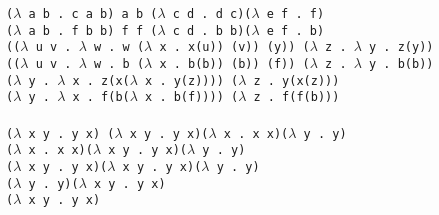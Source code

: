 \texttt{($\lambda$ a b .~c a b) a b ($\lambda$ c d .~d c)($\lambda$ e f .~f) }\\
\texttt{($\lambda$ a b .~f b b) f f ($\lambda$ c d .~b b)($\lambda$ e f .~b) }\\

\noindent
\texttt{(($\lambda$ u v .~$\lambda$ w .~w ($\lambda$ x .~x(u)) (v)) (y)) ($\lambda$ z .~$\lambda$ y .~z(y))}\\
\texttt{(($\lambda$ u v .~$\lambda$ w .~b ($\lambda$ x .~b(b)) (b)) (f)) ($\lambda$ z .~$\lambda$ y .~b(b))}\\

\noindent
\texttt{($\lambda$ y .~$\lambda$ x .~z(x($\lambda$ x .~y(z)))) ($\lambda$ z .~y(x(z)))}\\
\texttt{($\lambda$ y .~$\lambda$ x .~f(b($\lambda$ x .~b(f)))) ($\lambda$ z .~f(f(b)))}\\\\

\noindent
\texttt{($\lambda$ x y .~y x) ($\lambda$ x y .~y x)($\lambda$ x .~x x)($\lambda$ y .~y)} \\
\texttt{($\lambda$ x .~x x)($\lambda$ x y .~y x)($\lambda$ y .~y)} \\
\texttt{($\lambda$ x y .~y x)($\lambda$ x y .~y x)($\lambda$ y .~y)}\\ 
\texttt{($\lambda$ y .~y)($\lambda$ x y .~y x)} \\
\texttt{($\lambda$ x y .~y x)} \\